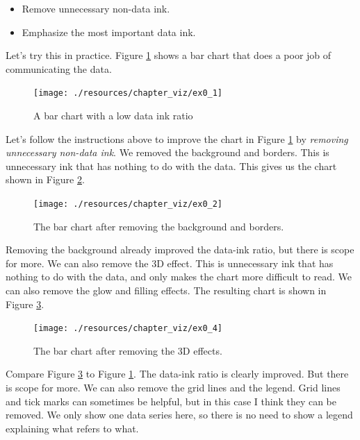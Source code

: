 \documentclass[
]{book}
\providecommand{\tightlist}{%
  \setlength{\itemsep}{0pt}\setlength{\parskip}{0pt}}
\begin{document}
\begin{itemize}
\tightlist
\item
  Remove unnecessary non-data ink.
\item
  Emphasize the most important data ink.
\end{itemize}

Let's try this in practice. Figure \ref{fig:viz12} shows a bar chart that does a poor job of communicating the data.

\begin{figure}

{\centering \texttt{[image: ./resources/chapter\_viz/ex0\_1]} 

}

\caption{A bar chart with a low data ink ratio}\label{fig:viz12}
\end{figure}

Let's follow the instructions above to improve the chart in Figure \ref{fig:viz12} by \emph{removing unnecessary non-data ink}. We removed the background and borders. This is unnecessary ink that has nothing to do with the data. This gives us the chart shown in Figure \ref{fig:viz13}.

\begin{figure}

{\centering \texttt{[image: ./resources/chapter\_viz/ex0\_2]} 

}

\caption{The bar chart after removing the background and borders.}\label{fig:viz13}
\end{figure}

Removing the background already improved the data-ink ratio, but there is scope for more. We can also remove the 3D effect. This is unnecessary ink that has nothing to do with the data, and only makes the chart more difficult to read. We can also remove the glow and filling effects. The resulting chart is shown in Figure \ref{fig:viz14}.

\begin{figure}

{\centering \texttt{[image: ./resources/chapter\_viz/ex0\_4]} 

}

\caption{The bar chart after removing the 3D effects.}\label{fig:viz14}
\end{figure}

Compare Figure \ref{fig:viz14} to Figure \ref{fig:viz12}. The data-ink ratio is clearly improved. But there is scope for more. We can also remove the grid lines and the legend. Grid lines and tick marks can sometimes be helpful, but in this case I think they can be removed. We only show one data series here, so there is no need to show a legend explaining what refers to what.
\end{document}
